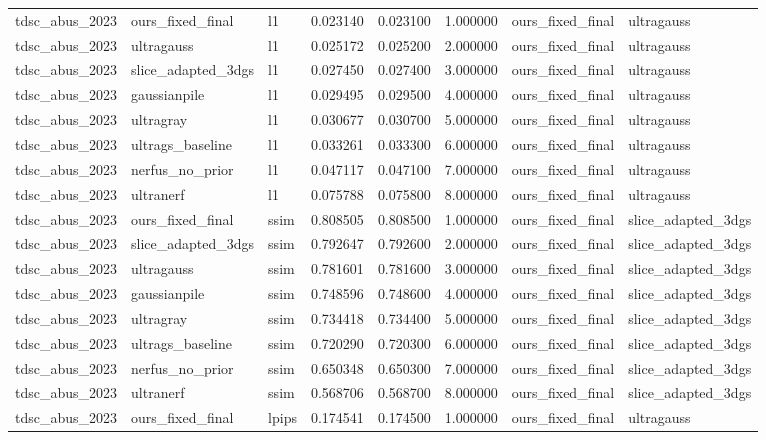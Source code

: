 \begin{tabular}{llllllll}
tdsc\_abus\_2023 & ours\_fixed\_final & l1 & 0.023140 & 0.023100 & 1.000000 & ours\_fixed\_final & ultragauss \\
tdsc\_abus\_2023 & ultragauss & l1 & 0.025172 & 0.025200 & 2.000000 & ours\_fixed\_final & ultragauss \\
tdsc\_abus\_2023 & slice\_adapted\_3dgs & l1 & 0.027450 & 0.027400 & 3.000000 & ours\_fixed\_final & ultragauss \\
tdsc\_abus\_2023 & gaussianpile & l1 & 0.029495 & 0.029500 & 4.000000 & ours\_fixed\_final & ultragauss \\
tdsc\_abus\_2023 & ultragray & l1 & 0.030677 & 0.030700 & 5.000000 & ours\_fixed\_final & ultragauss \\
tdsc\_abus\_2023 & ultrags\_baseline & l1 & 0.033261 & 0.033300 & 6.000000 & ours\_fixed\_final & ultragauss \\
tdsc\_abus\_2023 & nerfus\_no\_prior & l1 & 0.047117 & 0.047100 & 7.000000 & ours\_fixed\_final & ultragauss \\
tdsc\_abus\_2023 & ultranerf & l1 & 0.075788 & 0.075800 & 8.000000 & ours\_fixed\_final & ultragauss \\
tdsc\_abus\_2023 & ours\_fixed\_final & ssim & 0.808505 & 0.808500 & 1.000000 & ours\_fixed\_final & slice\_adapted\_3dgs \\
tdsc\_abus\_2023 & slice\_adapted\_3dgs & ssim & 0.792647 & 0.792600 & 2.000000 & ours\_fixed\_final & slice\_adapted\_3dgs \\
tdsc\_abus\_2023 & ultragauss & ssim & 0.781601 & 0.781600 & 3.000000 & ours\_fixed\_final & slice\_adapted\_3dgs \\
tdsc\_abus\_2023 & gaussianpile & ssim & 0.748596 & 0.748600 & 4.000000 & ours\_fixed\_final & slice\_adapted\_3dgs \\
tdsc\_abus\_2023 & ultragray & ssim & 0.734418 & 0.734400 & 5.000000 & ours\_fixed\_final & slice\_adapted\_3dgs \\
tdsc\_abus\_2023 & ultrags\_baseline & ssim & 0.720290 & 0.720300 & 6.000000 & ours\_fixed\_final & slice\_adapted\_3dgs \\
tdsc\_abus\_2023 & nerfus\_no\_prior & ssim & 0.650348 & 0.650300 & 7.000000 & ours\_fixed\_final & slice\_adapted\_3dgs \\
tdsc\_abus\_2023 & ultranerf & ssim & 0.568706 & 0.568700 & 8.000000 & ours\_fixed\_final & slice\_adapted\_3dgs \\
tdsc\_abus\_2023 & ours\_fixed\_final & lpips & 0.174541 & 0.174500 & 1.000000 & ours\_fixed\_final & ultragauss \\

\end{tabular}
